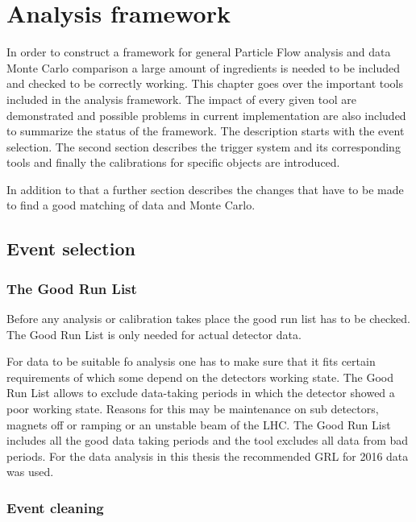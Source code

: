 \chapter{Analysis framework}

In order to construct a framework for general Particle Flow analysis and data Monte Carlo comparison a large amount of ingredients is needed to be included and checked to be correctly working. This chapter goes over the important tools included in the analysis framework. The impact of every given tool are demonstrated and possible problems in current implementation are also included to summarize the status of the framework.
The description starts with the event selection. The second section describes the trigger system and its corresponding tools and finally the calibrations for specific objects are introduced.

In addition to that a further section describes the changes that have to be made to find a good matching of data and Monte Carlo.




\section{Event selection}

\subsection{The Good Run List}

Before any analysis or calibration takes place the good run list has to be checked. The Good Run List is only needed for actual detector data.

For data to be suitable fo analysis one has to make sure that it fits certain requirements of which some depend on the detectors working state. The Good Run List allows to exclude data-taking periods in which the detector showed a poor working state. Reasons for this may be maintenance on sub detectors, magnets off or ramping or an unstable beam of the LHC.
The Good Run List includes all the good data taking periods and the tool excludes all data from bad periods.
For the data analysis in this thesis the recommended GRL for 2016 data was used.


\subsection{Event cleaning}

